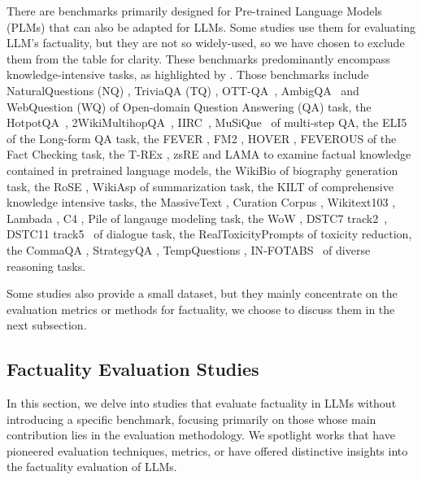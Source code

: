 There are benchmarks primarily designed for Pre-trained Language Models (PLMs) that can also be adapted for LLMs. Some studies use them for evaluating LLM's factuality, but they are not so widely-used, so we have chosen to exclude them from the table for clarity. These benchmarks predominantly encompass knowledge-intensive tasks, as highlighted by \citep{kilt}. Those benchmarks include NaturalQuestions (NQ) \citep{NQ}, TriviaQA (TQ) \citep{TQ}, OTT-QA~\citep{OTT-QA}, AmbigQA~\cite{ambigQA} and WebQuestion (WQ) \citep{WQ} of Open-domain Question Answering (QA) task, the HotpotQA~\citep{hotpotqa}, 2WikiMultihopQA~\citep{2WikiMultihopQA}, IIRC~\citep{IIRC}, MuSiQue~\citep{musique} of multi-step
QA, the ELI5 \citep{ELI5} of the Long-form QA task, the FEVER \citep{fever}, FM2 \citep{FM2}, HOVER \citep{HOVER}, FEVEROUS \citep{FEVEROUS} of the Fact Checking task, the T-REx \citep{TREx}, zsRE \citep{ZsRE} and LAMA \citep{LAMA} to examine factual knowledge contained in pretrained language models, the WikiBio \citep{wikiBio} of biography generation task, the RoSE \citep{Rose}, WikiAsp \citep{wikiasp} of summarization task, the KILT \citep{kilt} of comprehensive knowledge intensive tasks, the MassiveText \citep{Gopher}, Curation Corpus \citep{curation}, Wikitext103 \citep{Wikitext103}, Lambada \citep{lambada}, C4 \citep{C4}, Pile \citep{pile} of langauge modeling task, the WoW \citep{WoW}, DSTC7 track2~\citep{dstc7}, DSTC11 track5~\citep{dstc11} of dialogue task, the RealToxicityPrompts \cite{RealToxicityPrompts} of toxicity reduction, the CommaQA \citep{CommaQA}, StrategyQA \citep{StrategyQA}, TempQuestions \citep{TempQuestions}, IN-FOTABS~\citep{INFOTABS} of diverse reasoning tasks.


Some studies \citep{Min2023-FActScore, SelfCheckGPT} also provide a small dataset, but they mainly concentrate on the evaluation metrics or methods for factuality, we choose to discuss them in the next subsection.

\subsection{Factuality Evaluation Studies}
\label{sec:factuality-eval}



In this section, we delve into studies that evaluate factuality in LLMs without introducing a specific benchmark, focusing primarily on those whose main contribution lies in the evaluation methodology. We spotlight works that have pioneered evaluation techniques, metrics, or have offered distinctive insights into the factuality evaluation of LLMs.




